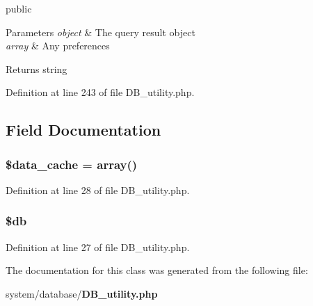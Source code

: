 public 
\begin{DoxyParams}{Parameters}
{\em object} & The query result object \\
\hline
{\em array} & Any preferences \\
\hline
\end{DoxyParams}
\begin{DoxyReturn}{Returns}
string 
\end{DoxyReturn}


Definition at line 243 of file D\-B\-\_\-utility.\-php.



\subsection{Field Documentation}
\subsubsection[{\$data\-\_\-cache}]{\setlength{\rightskip}{0pt plus 5cm}\$data\-\_\-cache = array()}\label{class_c_i___d_b__utility_aab3007e30adbaf71d06218aa6c90e384}


Definition at line 28 of file D\-B\-\_\-utility.\-php.

\subsubsection[{\$db}]{\setlength{\rightskip}{0pt plus 5cm}\$db}\label{class_c_i___d_b__utility_a1fa3127fc82f96b1436d871ef02be319}


Definition at line 27 of file D\-B\-\_\-utility.\-php.



The documentation for this class was generated from the following file\-:\begin{DoxyCompactItemize}
\item 
system/database/{\bf D\-B\-\_\-utility.\-php}\end{DoxyCompactItemize}
